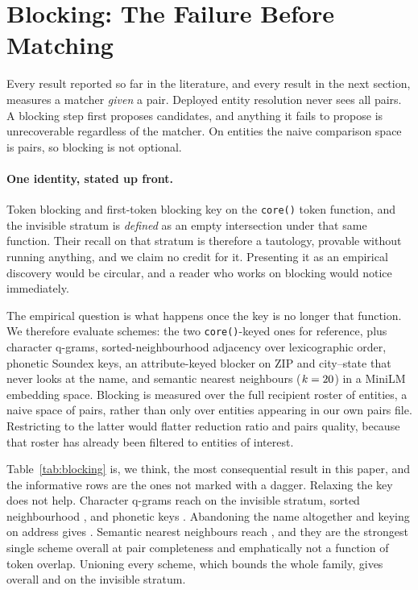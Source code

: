 \section{Blocking: The Failure Before Matching}
\label{sec:blocking}

Every result reported so far in the literature, and every result in the next section,
measures a matcher \emph{given} a pair. Deployed entity resolution never sees all pairs.
A blocking step first proposes candidates, and anything it fails to propose is
unrecoverable regardless of the matcher. On \BlkEntities entities the naive comparison
space is \BlkPairSpace pairs, so blocking is not optional.

\paragraph{One identity, stated up front.} Token blocking and first-token blocking key on
the \texttt{core()} token function, and the invisible stratum is \emph{defined} as an
empty intersection under that same function. Their \BlkTokenInvisible recall on that
stratum is therefore a tautology, provable without running anything, and we claim no
credit for it. Presenting it as an empirical discovery would be circular, and a reader
who works on blocking would notice immediately.

The empirical question is what happens once the key is no longer that function. We
therefore evaluate \BlkNumSchemes schemes: the two \texttt{core()}-keyed ones for
reference, plus character q-grams, sorted-neighbourhood adjacency over lexicographic
order, phonetic Soundex keys, an attribute-keyed blocker on ZIP and city--state that
never looks at the name, and semantic nearest neighbours ($k=20$) in a MiniLM
embedding space. Blocking is measured over the full recipient roster of \BlkEntities
entities, a naive space of \BlkPairSpace pairs, rather than only over entities appearing
in our own pairs file. Restricting to the latter would flatter reduction ratio and
pairs quality, because that roster has already been filtered to entities of interest.



Table~\ref{tab:blocking} is, we think, the most consequential result in this paper, and
the informative rows are the ones not marked with a dagger. Relaxing the key does not
help. Character q-grams reach \BlkQgramInvisible on the invisible stratum, sorted
neighbourhood \BlkSnInvisible, and phonetic keys \BlkPhonInvisible. Abandoning the name
altogether and keying on address gives \BlkAttrInvisible. Semantic nearest neighbours
reach \BlkAnnInvisible, and they are the strongest single scheme overall at \BlkAnnPC
pair completeness and emphatically not a function of token overlap. Unioning every scheme, which
bounds the whole family, gives \BlkUnionPC overall and \BlkUnionInvisible on the
invisible stratum.

